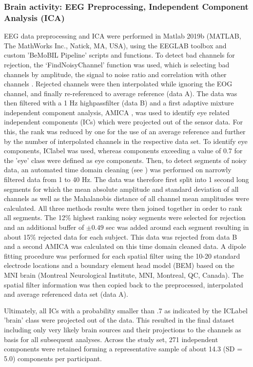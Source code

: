 \subsubsection{Brain activity: EEG Preprocessing, Independent Component Analysis (ICA)}
EEG data preprocessing and ICA were performed in Matlab 2019b (MATLAB, The MathWorks Inc., Natick, MA, USA), using the EEGLAB toolbox \cite{Delorme2004-sn} and custom 'BeMoBIL Pipeline' scripts and functions. To detect bad channels for rejection, the `FindNoisyChannel' function was used, which is selecting bad channels by amplitude, the signal to noise ratio and correlation with other channels \cite{Bigdely-Shamlo2015-ds}. Rejected channels were then interpolated while ignoring the EOG channel, and finally re-referenced to average reference (data A). The data was then filtered with a 1 Hz highpassfilter (data B) and a first adaptive mixture independent component analysis, AMICA \cite{Palmer2011-zs}, was used to identify eye related independent components (ICs) which were projected out of the sensor data. For this, the rank was reduced by one for the use of an average reference and further by the number of interpolated channels in the respective data set. To identify eye components, IClabel \cite{Pion-Tonachini2019-fy} was used, whereas components exceeding a value of 0.7 for the 'eye' class were defined as eye components. Then, to detect segments of noisy data, an automated time domain cleaning (see \cite{gramann2021human}) was performed on narrowly filtered data from 1 to 40 Hz. The data was therefore first split into 1 second long segments for which the mean absolute amplitude and standard deviation of all channels as well as the Mahalanobis distance of all channel mean amplitudes were calculated. All three methods results were then joined together in order to rank all segments. The 12\% highest ranking noisy segments were selected for rejection and an additional buffer of $\pm 0.49$ sec was added around each segment resulting in about 15\% rejected data for each subject. This data was rejected from data B and a second AMICA was calculated on this time domain cleaned data. A dipole fitting procedure was performed for each spatial filter using the 10-20 standard electrode locations and a boundary element head model (BEM) based on the MNI brain (Montreal Neurological Institute, MNI, Montreal, QC, Canada). The spatial filter information was then copied back to the preprocessed, interpolated and average referenced data set (data A). 

Ultimately, all ICs with a probability smaller than .7 as indicated by the ICLabel 'brain' class were projected out of the data. This resulted in the final dataset including only very likely brain sources and their projections to the channels as basis for all subsequent analyses. Across the study set, 271 independent components were retained forming a representative sample of about 14.3 (SD = 5.0) components per participant. 




